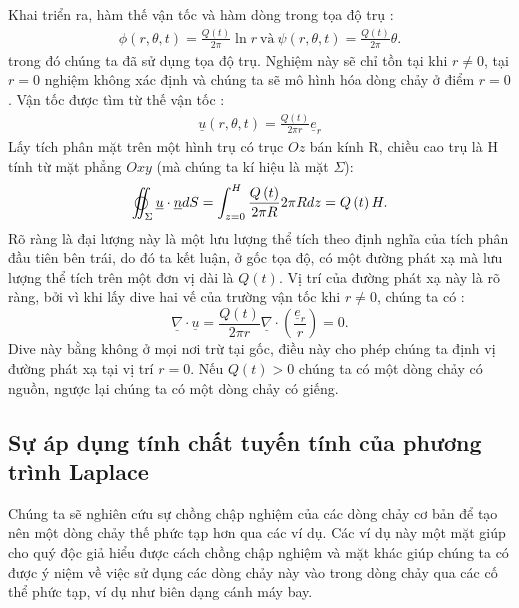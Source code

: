 \documentclass[CO_LUU_CHAT.tex]{subfiles}
\begin{document}
Khai triển ra, hàm thế vận tốc và hàm dòng trong tọa độ trụ :
\begin{equation}
	\begin{aligned}
		\phi(r,\theta,t)=\frac{Q(t)}{2\pi}\ln r\ \text{và}\ \psi(r,\theta,t)=\frac{Q(t)}{2\pi}\theta.
	\end{aligned}
\end{equation}
trong đó chúng ta đã sử dụng tọa độ trụ. Nghiệm này sẽ chỉ tồn tại khi $r\ne 0$, tại $r=0$ nghiệm không xác định và chúng ta sẽ mô hình hóa dòng chảy ở điểm $r=0$. Vận tốc được tìm từ thế vận tốc :
\begin{equation}
	\begin{aligned}
		\underline{u}(r,\theta,t)=\frac{Q(t)}{2\pi r}\underline{e}_r
	\end{aligned}
\end{equation}
Lấy tích phân mặt trên một hình trụ có trục $Oz$ bán kính R, chiều cao trụ là H tính từ mặt phẳng $Oxy$ (mà chúng ta kí hiệu là mặt $\Sigma$):
$$
\varoiint_{\Sigma}
{\underline u  \cdot \underline n dS}  = \int_{z = 0}^H {\frac{{Q\left( t \right)}}{2\pi R}2\pi Rdz}  = Q\left( t \right)H.
$$
Rõ ràng là đại lượng này là một lưu lượng thể tích theo định nghĩa của tích phân đầu tiên bên trái, do đó ta kết luận, ở gốc tọa độ, có một đường phát xạ mà lưu lượng thể tích trên một đơn vị dài là $Q(t)$. Vị trí của đường phát xạ này là rõ ràng, bởi vì khi lấy dive hai vế của trường vận tốc khi $r\ne 0$, chúng ta có :
$$
\underline{\nabla}\cdot\underline{u}=\frac{Q(t)}{2\pi r}\underline{\nabla}\cdot\left(\frac{\underline{e}_r}{r}\right)=0.
$$
Dive này bằng không ở mọi nơi trừ tại gốc, điều này cho phép chúng ta định vị đường phát xạ tại vị trí $r=0$. Nếu $Q(t)>0$ chúng ta có một dòng chảy có nguồn, ngược lại chúng ta có một dòng chảy có giếng.
\subsection{Sự áp dụng tính chất tuyến tính của phương trình Laplace}
Chúng ta sẽ nghiên cứu sự chồng chập nghiệm của các dòng chảy cơ bản để tạo nên một dòng chảy thế phức tạp hơn qua các ví dụ. Các ví dụ này một mặt giúp cho quý độc giả hiểu được cách chồng chập nghiệm và mặt khác giúp chúng ta có được ý niệm về việc sử dụng các dòng chảy này vào trong dòng chảy qua các cố thể phức tạp, ví dụ như biên dạng cánh máy bay.
\end{document}
